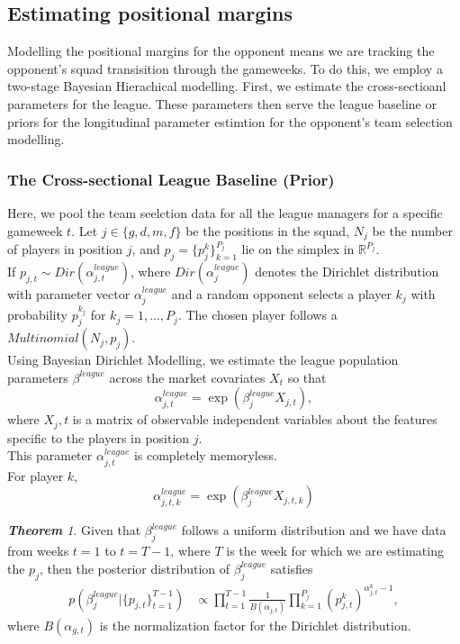 \documentclass[12pt,oneside,a4paper]{book}
\theoremstyle{definition}
\theoremstyle{remark}
\newtheorem{thm}{\bf Theorem}[subsection]
\begin{document}
			\subsection{Estimating positional margins}
				Modelling the positional margins for the opponent means we are tracking the opponent's squad transisition through the gameweeks. To do this, we employ a two-stage Bayesian Hierachical modelling.
				First, we estimate the cross-sectioanl parameters for the league. These parameters then serve the league baseline or priors for the longitudinal parameter estimtion for the opponent's team selection modelling.

				\subsubsection{The Cross-sectional League Baseline (Prior)}
				Here, we pool the team seelction data for all the league managers for a specific gameweek $t$. Let $j \in \{g,d,m,f\}$ be the positions in the squad, $N_j$ be the number of players in position $j$, and $p_j = \{p_j^k\}_{k=1}^{P_j}$ lie on the simplex in $\mathbb{R}^{P_j}$.\\
				If $p_{j,t} \sim Dir(\alpha^{league}_{j,t})$, where $Dir (\alpha^{league}_j)$ denotes the Dirichlet distribution with parameter vector $\alpha^{league}_j$ and a random opponent selects a player $k_j$ with probability $p_j^{k_j}$ for $k_j = 1, ..., P_j$. The chosen player follows a $Multinomial(N_j, p_j)$.\\
				Using Bayesian Dirichlet Modelling, we estimate the league population parameters $\beta^{league}$ across the market covariates  $X_t$ so that
				\begin{equation}\label{eq:alpha_league}
					\alpha_{j,t}^{league} = \exp\left(\beta_{j}^{league} X_{j,t} \right),
				\end{equation}
				where $X_j,t$ is a matrix of observable independent variables about the features specific to the players in position $j$.\\
				This parameter $\alpha_{j,t}^{league}$ is completely memoryless.\\
				For player $k$, $$ \alpha_{j,t, k}^{league} = \exp\left(\beta_{j}^{league} X_{j,t, k} \right)$$

				\begin{thm}
					Given that $\beta^{league}_{j}$ follows a uniform distribution and we have data from weeks $t=1$ to $t=T-1$, where $T$ is the week for which we are estimating the $p_j$, then the posterior distribution of $\beta_j^{league}$ satisfies
					\begin{equation}\label{Eq:beta_league}
						\begin{aligned}
							p(\beta_j^{league} | \{ p_{j,t}\}_{t=1}^{T-1})
							& \propto \prod_{t=1}^{T-1} \frac{1}{B(\alpha_{j,t})} \prod_{k=1}^{P_j}(p_{j,t}^k)^{\alpha_{j,t}^k-1},
						\end{aligned}
					\end{equation} where $B(\alpha_{g,t})$ is the normalization factor for the Dirichlet distribution.
				\end{thm}
\end{document}
